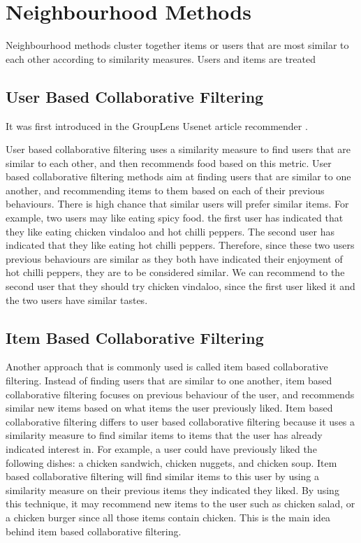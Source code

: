 \section{Neighbourhood Methods}


Neighbourhood methods cluster together items or users that are most similar to each other according to similarity measures. Users and items are treated 

\subsection{User Based Collaborative Filtering}

It was first introduced in the GroupLens Usenet article recommender \cite{grouplens}. 

User based collaborative filtering uses a similarity measure to find users that are similar to each other, and then recommends food based on this metric. User based collaborative filtering methods aim at finding users that are similar to one another, and recommending items to them based on each of their previous behaviours. There is high chance that similar users will prefer similar items. For example, two users may like eating spicy food. the first user has indicated that they like eating chicken vindaloo and hot chilli peppers. The second user has indicated that they like eating hot chilli peppers. Therefore, since these two users previous behaviours are similar as they both have indicated their enjoyment of hot chilli peppers, they are to be considered similar. We can recommend to the second user that they should try chicken vindaloo, since the first user liked it and the two users have similar tastes.  


\subsection{Item Based Collaborative Filtering}

Another approach that is commonly used is called item based collaborative filtering. Instead of finding users that are similar to one another, item based collaborative filtering focuses on previous behaviour of the user, and recommends similar new items based on what items the user previously liked. Item based collaborative filtering differs to user based collaborative filtering because it uses a similarity measure to find similar items to items that the user has already indicated interest in. For example, a user could have previously liked the following dishes: a chicken sandwich, chicken nuggets, and chicken soup. Item based collaborative filtering will find similar items to this user by using a similarity measure on their previous items they indicated they liked. By using this technique, it may recommend new items to the user such as chicken salad, or a chicken burger since all those items contain chicken. This is the main idea behind item based collaborative filtering. 

